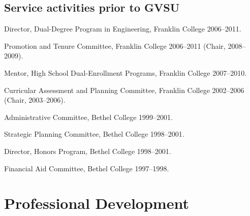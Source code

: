 \documentclass[letterpaper]{article}
\renewenvironment{itemize}{
  \begin{list}{}{
    \setlength{\leftmargin}{1.5em}
	\setlength{\itemsep}{0in}
  }
}{
  \end{list}
}
\begin{document}
\subsection*{Service activities prior to GVSU}
\begin{itemize}
	\item Director, Dual-Degree Program in Engineering, Franklin College 2006--2011.
	\item Promotion and Tenure Committee, Franklin College 2006--2011 (Chair, 2008--2009).
	\item Mentor, High School Dual-Enrollment Programs, Franklin College 2007--2010.
	\item Curricular Assessment and Planning Committee, Franklin College 2002--2006 (Chair, 2003--2006).
	\item Administrative Committee, Bethel College 1999--2001.
	\item Strategic Planning Committee, Bethel College 1998--2001.
	\item Director, Honors Program, Bethel College 1998--2001.
	\item Financial Aid Committee, Bethel College 1997--1998.
\end{itemize}


\section*{Professional Development}
\end{document}
